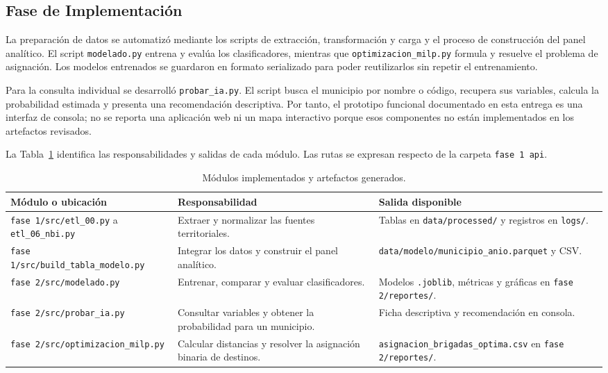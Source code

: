 \documentclass[12pt]{article}
\begin{document}
\subsection{Fase de Implementación}
La preparación de datos se automatizó mediante los scripts de extracción, transformación y carga y el proceso de construcción del panel analítico. El script \texttt{modelado.py} entrena y evalúa los clasificadores, mientras que \texttt{optimizacion\_milp.py} formula y resuelve el problema de asignación. Los modelos entrenados se guardaron en formato serializado para poder reutilizarlos sin repetir el entrenamiento.

Para la consulta individual se desarrolló \texttt{probar\_ia.py}. El script busca el municipio por nombre o código, recupera sus variables, calcula la probabilidad estimada y presenta una recomendación descriptiva. Por tanto, el prototipo funcional documentado en esta entrega es una interfaz de consola; no se reporta una aplicación web ni un mapa interactivo porque esos componentes no están implementados en los artefactos revisados.

La Tabla~\ref{tab:modulos} identifica las responsabilidades y salidas de cada módulo. Las rutas se expresan respecto de la carpeta \texttt{fase 1 api}.

\begin{table}[H]
\centering
\footnotesize
\caption{Módulos implementados y artefactos generados.}
\label{tab:modulos}
\begin{tabular}{@{}>{\raggedright\arraybackslash}p{4.8cm}
                    >{\raggedright\arraybackslash}p{5cm}
                    >{\raggedright\arraybackslash}p{5.4cm}@{}}
\toprule
\textbf{Módulo o ubicación} & \textbf{Responsabilidad} & \textbf{Salida disponible} \\
\midrule
\texttt{fase 1/src/etl\_00.py} a \texttt{etl\_06\_nbi.py} & Extraer y normalizar las fuentes territoriales. & Tablas en \texttt{data/processed/} y registros en \texttt{logs/}. \\
\texttt{fase 1/src/}\newline\texttt{build\_tabla\_modelo.py} & Integrar los datos y construir el panel analítico. & \texttt{data/modelo/}\newline\texttt{municipio\_anio.parquet} y CSV. \\
\texttt{fase 2/src/modelado.py} & Entrenar, comparar y evaluar clasificadores. & Modelos \texttt{.joblib}, métricas y gráficas en \texttt{fase 2/reportes/}. \\
\texttt{fase 2/src/probar\_ia.py} & Consultar variables y obtener la probabilidad para un municipio. & Ficha descriptiva y recomendación en consola. \\
\texttt{fase 2/src/}\newline\texttt{optimizacion\_milp.py} & Calcular distancias y resolver la asignación binaria de destinos. & \texttt{asignacion\_brigadas\_}\newline\texttt{optima.csv} en \texttt{fase 2/reportes/}. \\
\bottomrule
\end{tabular}
\end{table}
\end{document}
